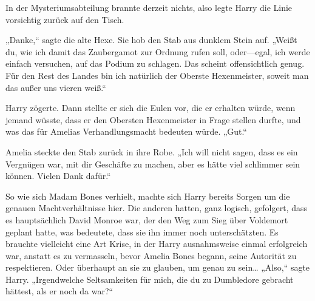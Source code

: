 In der Mysteriumsabteilung brannte derzeit nichts, also legte Harry die Linie vorsichtig zurück auf den Tisch.

„Danke,“ sagte die alte Hexe. Sie hob den Stab aus dunklem Stein auf. „Weißt du, wie ich damit das Zaubergamot zur Ordnung rufen soll, oder—egal, ich werde einfach versuchen, auf das Podium zu schlagen. Das scheint offensichtlich genug. Für den Rest des Landes bin ich natürlich der Oberste Hexenmeister, soweit man das außer uns vieren weiß.“

Harry zögerte. Dann stellte er sich die Eulen vor, die er erhalten würde, wenn jemand wüsste, dass er den Obersten Hexenmeister in Frage stellen durfte, und was das für Amelias Verhandlungsmacht bedeuten würde.
„Gut.“

Amelia steckte den Stab zurück in ihre Robe.
„Ich will nicht sagen, dass es ein Vergnügen war, mit dir Geschäfte zu machen, aber es hätte viel schlimmer sein können. Vielen Dank dafür.“

So wie sich Madam Bones verhielt, machte sich Harry bereits Sorgen um die genauen Machtverhältnisse hier. Die anderen hatten, ganz logisch, gefolgert, dass es hauptsächlich David Monroe war, der den Weg zum Sieg über Voldemort geplant hatte, was bedeutete, dass sie ihn immer noch unterschätzten. Es brauchte vielleicht eine Art Krise, in der Harry ausnahmsweise einmal erfolgreich war, anstatt es zu vermasseln, bevor Amelia Bones begann, seine Autorität zu respektieren. Oder überhaupt an sie zu glauben, um genau zu sein…
„Also,“ sagte Harry. „Irgendwelche Seltsamkeiten für mich, die du zu Dumbledore gebracht hättest, als er noch da war?“

